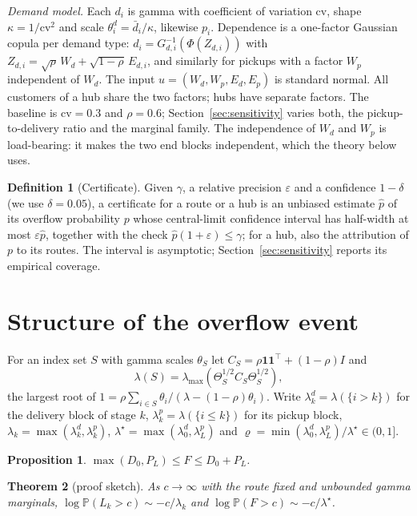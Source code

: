 \documentclass[11pt]{article}
\newtheorem{theorem}{Theorem}
\newtheorem{proposition}[theorem]{Proposition}
\theoremstyle{definition}
\newtheorem{definition}{Definition}
\theoremstyle{remark}
\renewcommand{\P}{\mathbb{P}}
\begin{document}
\emph{Demand model.} Each $d_i$ is gamma with coefficient of variation cv,
shape $\kappa = 1/\mathrm{cv}^2$ and scale $\theta^d_i = \bar d_i/\kappa$,
likewise $p_i$. Dependence is a one-factor Gaussian copula per demand type:
$d_i = G_{d,i}^{-1}(\Phi(Z_{d,i}))$ with
$Z_{d,i} = \sqrt{\rho}\,W_d + \sqrt{1-\rho}\,E_{d,i}$, and similarly for
pickups with a factor $W_p$ independent of $W_d$. The input
$u = (W_d, W_p, E_d, E_p)$ is standard normal. All customers of a hub share the
two factors; hubs have separate factors. The baseline is $\mathrm{cv}=0.3$ and
$\rho=0.6$; Section~\ref{sec:sensitivity} varies both, the pickup-to-delivery
ratio and the marginal family. The independence of $W_d$ and $W_p$ is
load-bearing: it makes the two end blocks independent, which the theory below
uses.

\begin{definition}[Certificate]
Given $\gamma$, a relative precision $\varepsilon$ and a confidence $1-\delta$
(we use $\delta=0.05$), a certificate for a route or a hub is an unbiased
estimate $\hat p$ of its overflow probability $p$ whose central-limit
confidence interval has half-width at most $\varepsilon\hat p$, together with
the check $\hat p(1+\varepsilon) \le \gamma$; for a hub, also the attribution of
$p$ to its routes. The interval is asymptotic; Section~\ref{sec:sensitivity}
reports its empirical coverage.
\end{definition}

\section{Structure of the overflow event}
\label{sec:structure}

For an index set $S$ with gamma scales $\theta_S$ let
$C_S = \rho\mathbf{1}\mathbf{1}^\top + (1-\rho)I$ and
\[
\lambda(S) = \lambda_{\max}\!\left(\Theta_S^{1/2} C_S \Theta_S^{1/2}\right),
\]
the largest root of $1 = \rho\sum_{i\in S}\theta_i/(\lambda-(1-\rho)\theta_i)$.
Write $\lambda^d_k = \lambda(\{i>k\})$ for the delivery block of stage $k$,
$\lambda^p_k = \lambda(\{i\le k\})$ for its pickup block,
$\lambda_k = \max(\lambda^d_k,\lambda^p_k)$,
$\lambda^\star = \max(\lambda^d_0,\lambda^p_L)$ and
$\varrho = \min(\lambda^d_0,\lambda^p_L)/\lambda^\star \in (0,1]$.

\begin{proposition}\label{prop:sandwich}
$\max(D_0, P_L) \le F \le D_0 + P_L$.
\end{proposition}

\begin{theorem}[proof sketch]\label{thm:ld}
As $c\to\infty$ with the route fixed and unbounded gamma marginals,
$\log\P(L_k > c) \sim -c/\lambda_k$ and $\log\P(F > c) \sim -c/\lambda^\star$.
\end{theorem}
\end{document}
